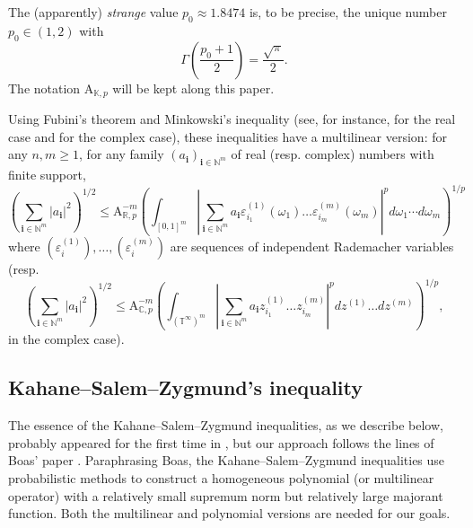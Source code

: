 \documentclass[10pt]{amsart}
\numberwithin{equation}{section}
\begin{document}
The (apparently) \emph{strange} value $p_{0}\approx 1.8474$ is, to be
precise, the unique number $p_{0}\in (1,2)$ with
\begin{equation*}
\Gamma \left( \frac{p_{0}+1}{2}\right) =\frac{\sqrt{\pi }}{2}.
\end{equation*}The notation $\mathrm{A}_{\mathbb{K},p}$ will be kept along this paper.

Using Fubini's theorem and Minkowski's inequality (see, for instance, \cite[Lemma 2.2]{defa} for the real case and \cite[Theorem 2.2]{ddss} for the
complex case), these inequalities have a multilinear version: for any $n,m\geq 1$, for any family $(a_{\mathbf{i}})_{\mathbf{i}\in \mathbb{N}^{m}}$
of real (resp. complex) numbers with finite support,
\begin{equation*}
\left( \sum_{\mathbf{i}\in \mathbb{N}^{m}}|a_{\mathbf{i}}|^{2}\right)
^{1/2}\leq \mathrm{A}_{\mathbb{R},p}^{-m}\left( \int_{[0,1]^m }\left\vert
\sum_{\mathbf{i}\in \mathbb{N}^{m}}a_{\mathbf{i}}\varepsilon
_{i_{1}}^{(1)}(\omega_1 )\dots \varepsilon _{i_{m}}^{(m)}(\omega_m
)\right\vert ^{p}d\omega_1 \cdots d\omega_m \right) ^{1/p}
\end{equation*}where $(\varepsilon _{i}^{(1)}),\dots ,(\varepsilon _{i}^{(m)})$ are
sequences of independent Rademacher variables (resp.
\begin{equation*}
\left( \sum_{\mathbf{i}\in \mathbb{N}^{m}}|a_{\mathbf{i}}|^{2}\right)
^{1/2}\leq \mathrm{A}_{\mathbb{C},p}^{-m}\left( \int_{(\mathbb{T}^{\infty
})^{m}}\left\vert \sum_{\mathbf{i}\in \mathbb{N}^{m}}a_{\mathbf{i}}z_{i_{1}}^{(1)}\dots z_{i_{m}}^{(m)}\right\vert ^{p}dz^{(1)}\dots
dz^{(m)}\right) ^{1/p},
\end{equation*}in the complex case).

\subsection{Kahane--Salem--Zygmund's inequality}

The essence of the Kahane--Salem--Zygmund inequalities, as we describe
below, probably appeared for the first time in \cite{Kahane}, but our
approach follows the lines of Boas' paper \cite{korea}. Paraphrasing Boas,
the Kahane--Salem--Zygmund inequalities use probabilistic methods to
construct a homogeneous polynomial (or multilinear operator) with a
relatively small supremum norm but relatively large majorant function. Both
the multilinear and polynomial versions are needed for our goals.
\end{document}
